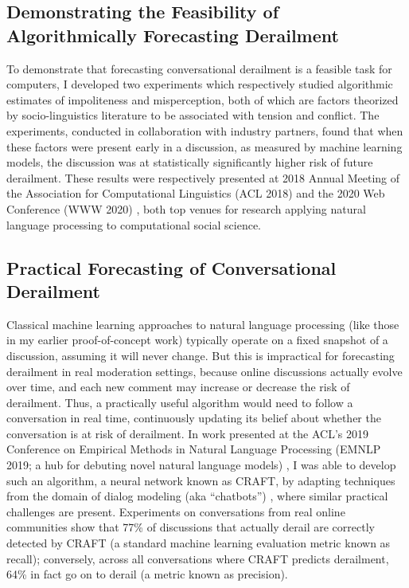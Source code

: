 \documentclass[12pt,letterpaper]{article}
\begin{document}
\subsection{Demonstrating the Feasibility of Algorithmically Forecasting Derailment}
To demonstrate that forecasting conversational derailment is a feasible task for computers, I developed two experiments which respectively studied algorithmic estimates of impoliteness and misperception, both of which are factors theorized by socio-linguistics literature to be associated with tension and conflict.
The experiments, conducted in collaboration with industry partners, found that when these factors were present early in a discussion, as measured by machine learning models, the discussion was at statistically significantly higher risk of future derailment.
These results were respectively presented at 2018 Annual Meeting of the Association for Computational Linguistics (ACL 2018) \cite{zhang_conversations_2018} and the 2020 Web Conference (WWW 2020) \cite{chang_dont_2020}, both top venues for research applying natural language processing to computational social science.

\subsection{Practical Forecasting of Conversational Derailment}
Classical machine learning approaches to natural language processing 
(like those in my earlier proof-of-concept work) 
typically operate on a fixed snapshot of a discussion, assuming it will never change.
But this is impractical for forecasting derailment in real moderation settings, because online discussions actually evolve over time, and each new comment may increase or decrease the risk of derailment.
Thus, a practically useful algorithm would need to follow a conversation in real time, continuously updating its belief about whether the conversation is at risk of derailment.
In work presented at the ACL's 2019 Conference on Empirical Methods in Natural Language Processing (EMNLP 2019; a hub for debuting novel natural language models) \cite{chang_trouble_2019}, I was able to develop such an algorithm, a neural network known as CRAFT, by adapting techniques from the domain of dialog modeling (aka ``chatbots'') \cite{serban_building_2016}, where similar practical challenges are present.
Experiments on conversations from real online communities show that 77\% of discussions that actually derail are correctly detected by CRAFT (a standard machine learning evaluation metric known as recall); conversely, across all conversations where CRAFT predicts derailment, 64\% in fact go on to derail (a metric known as precision).
\end{document}
